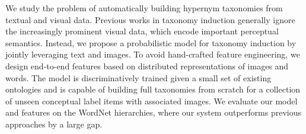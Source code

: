 We study the problem of automatically building hypernym taxonomies from textual and visual data. Previous works in taxonomy induction generally ignore the increasingly prominent visual data, which encode important perceptual semantics. Instead, we propose a probabilistic model for taxonomy induction by jointly leveraging text and images. To avoid hand-crafted feature engineering, we design end-to-end features based on distributed representations of images and words. The model is discriminatively trained given a small set of existing ontologies and is capable of building full taxonomies from scratch for a collection of unseen conceptual label items with associated images. We evaluate our model and features on the WordNet hierarchies, where our system outperforms previous approaches by a large gap.
